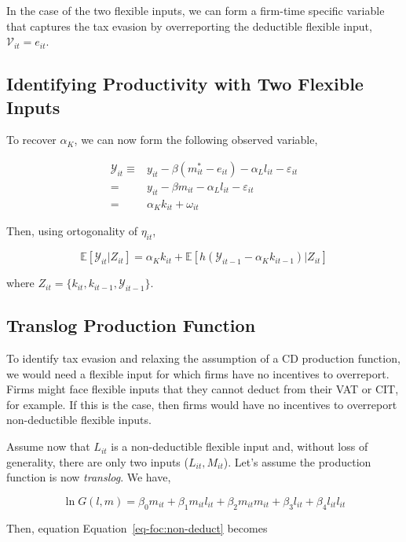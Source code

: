 \documentclass[
  12pt]{article}
\theoremstyle{definition}
\theoremstyle{remark}
\begin{document}
In the case of the two flexible inputs, we can form a firm-time specific
variable that captures the tax evasion by overreporting the deductible
flexible input, \(\mathcal{V}_{it}=e_{it}\).

\subsection{Identifying Productivity with Two Flexible
Inputs}\label{identifying-productivity-with-two-flexible-inputs}

To recover \(\alpha_K\), we can now form the following observed
variable,

\[
\begin{aligned}
    \mathcal{Y}_{it} \equiv& y_{it} - \beta (m^*_{it}-e_{it}) - \alpha_L l_{it} - \varepsilon_{it}\\
    =& y_{it} - \beta m_{it} - \alpha_L l_{it} - \varepsilon_{it}\\
    =& \alpha_K k_{it} + \omega_{it}
\end{aligned}
\]

Then, using ortogonality of \(\eta_{it}\),

\[
\mathbb{E}[\mathcal{Y}_{it}|Z_{it}]=\alpha_K k_{it} + \mathbb{E}[h(\mathcal{Y}_{it-1}-\alpha_K k_{it-1})|Z_{it}]
\]

where \(Z_{it}=\{k_{it},k_{it-1},\mathcal{Y}_{it-1}\}\).

\subsection{Translog Production
Function}\label{translog-production-function}

To identify tax evasion and relaxing the assumption of a CD production
function, we would need a flexible input for which firms have no
incentives to overreport. Firms might face flexible inputs that they
cannot deduct from their VAT or CIT, for example. If this is the case,
then firms would have no incentives to overreport non-deductible
flexible inputs.

Assume now that \(L_{it}\) is a non-deductible flexible input and,
without loss of generality, there are only two inputs
(\(L_{it}, M_{it}\)). Let's assume the production function is now
\emph{translog}. We have,

\[
 \ln G(l,m)=\beta_0m_{it}+\beta_1m_{it}l_{it}+\beta_2m_{it}m_{it}+\beta_3l_{it}+\beta_4l_{it}l_{it}
\]

Then, equation Equation~\ref{eq-foc:non-deduct} becomes
\end{document}
